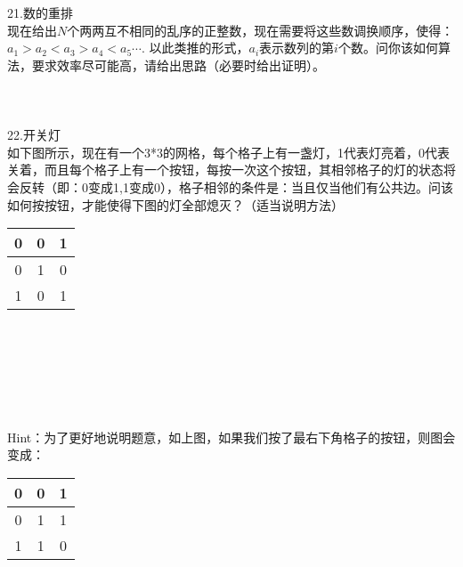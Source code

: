 \noindent 21.数的重排 \\
现在给出$N$个两两互不相同的乱序的正整数，现在需要将这些数调换顺序，使得：$a_1 > a_2 < a_3 > a_4 < a_5 \cdots$. 以此类推的形式，$a_i$表示数列的第$i$个数。问你该如何算法，要求效率尽可能高，请给出思路（必要时给出证明）。\\
\\
\\
\\
\noindent 22.开关灯 \\
如下图所示，现在有一个3*3的网格，每个格子上有一盏灯，1代表灯亮着，0代表关着，而且每个格子上有一个按钮，每按一次这个按钮，其相邻格子的灯的状态将会反转（即：0变成1,1变成0），格子相邻的条件是：当且仅当他们有公共边。问该如何按按钮，才能使得下图的灯全部熄灭？（适当说明方法）
\begin{table}[!hbp]
\begin{tabular}{|c|c|c|}
\hline
 0 &  0 &  1 \\
\hline
 0 &  1 &  0 \\
\hline
 1 &  0 &  1 \\
\hline
\end{tabular}
\end{table} 
\\
\\
\\
\\
\\
\\
Hint：为了更好地说明题意，如上图，如果我们按了最右下角格子的按钮，则图会变成：
\begin{table}[!hbp]
\begin{tabular}{|c|c|c|}
\hline
 0 &  0 &  1 \\
\hline
 0 &  1 &  1 \\
\hline
 1 &  1 &  0 \\
\hline
\end{tabular}
\end{table} 

